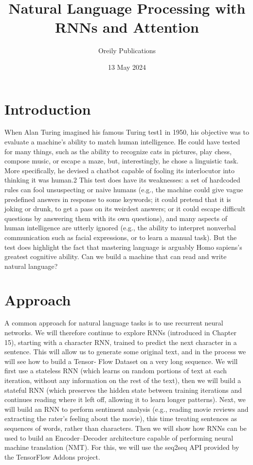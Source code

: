 \documentclass[twocolumn]{article}
\title{Natural Language Processing with RNNs and Attention}
\author{Oreily Publications}
\date{13 May 2024}
\begin{document}
\maketitle
\section{Introduction}
When Alan Turing imagined his famous Turing test1 in 1950, his objective was to evaluate a machine’s ability to match human intelligence. He could have tested for many things, such as the ability to recognize cats in pictures, play chess, compose music, or escape a maze, but, interestingly, he chose a linguistic task. More specifically, he devised a chatbot capable of fooling its interlocutor into thinking it was human.2 This test does have its weaknesses: a set of hardcoded rules can fool unsuspecting or naive humans (e.g., the machine could give vague predefined answers in response to some keywords; it could pretend that it is joking or drunk, to get a pass on its weirdest answers; or it could escape difficult questions by answering them with its own questions), and many aspects of human intelligence are utterly ignored (e.g., the ability to interpret nonverbal communication such as facial expressions, or to learn a manual task). But the test does highlight the fact that mastering language is arguably Homo sapiens’s greatest cognitive ability. Can we build a machine that can read and write natural language?\\

\section{Approach}
A common approach for natural language tasks is to use recurrent neural networks. We will therefore continue to explore RNNs (introduced in Chapter 15), starting with a character RNN, trained to predict the next character in a sentence. This will allow us to generate some original text, and in the process we will see how to build a Tensor‐ Flow Dataset on a very long sequence. We will first use a stateless RNN (which learns on random portions of text at each iteration, without any information on the rest of the text), then we will build a stateful RNN (which preserves the hidden state between training iterations and continues reading where it left off, allowing it to learn longer patterns). Next, we will build an RNN to perform sentiment analysis (e.g., reading movie reviews and extracting the rater’s feeling about the movie), this time treating sentences as sequences of words, rather than characters. Then we will show how RNNs can be used to build an Encoder–Decoder architecture capable of performing neural machine translation (NMT). For this, we will use the seq2seq API provided by the TensorFlow Addons project.
\end{document}
